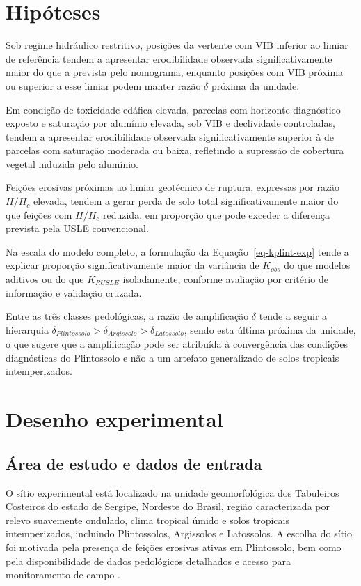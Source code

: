 \documentclass[
  brazilian,
  authoryear,
  preprint]{elsarticle}
\begin{document}
\section{Hipóteses}\label{hipuxf3teses}

Sob regime hidráulico restritivo, posições da vertente com VIB inferior
ao limiar de referência tendem a apresentar erodibilidade observada
significativamente maior do que a prevista pelo nomograma, enquanto
posições com VIB próxima ou superior a esse limiar podem manter razão
\(\delta\) próxima da unidade.

Em condição de toxicidade edáfica elevada, parcelas com horizonte
diagnóstico exposto e saturação por alumínio elevada, sob VIB e
declividade controladas, tendem a apresentar erodibilidade observada
significativamente superior à de parcelas com saturação moderada ou
baixa, refletindo a supressão de cobertura vegetal induzida pelo
alumínio.

Feições erosivas próximas ao limiar geotécnico de ruptura, expressas por
razão \(H/H_c\) elevada, tendem a gerar perda de solo total
significativamente maior do que feições com \(H/H_c\) reduzida, em
proporção que pode exceder a diferença prevista pela USLE convencional.

Na escala do modelo completo, a formulação da
Equação~\ref{eq-kplint-exp} tende a explicar proporção
significativamente maior da variância de \(K_{obs}\) do que modelos
aditivos ou do que \(K_{RUSLE}\) isoladamente, conforme avaliação por
critério de informação e validação cruzada.

Entre as três classes pedológicas, a razão de amplificação \(\delta\)
tende a seguir a hierarquia
\(\delta_{Plintossolo} > \delta_{Argissolo} > \delta_{Latossolo}\),
sendo esta última próxima da unidade, o que sugere que a amplificação
pode ser atribuída à convergência das condições diagnósticas do
Plintossolo e não a um artefato generalizado de solos tropicais
intemperizados.

\section{Desenho experimental}\label{desenho-experimental}

\subsection{Área de estudo e dados de
entrada}\label{uxe1rea-de-estudo-e-dados-de-entrada}

O sítio experimental está localizado na unidade geomorfológica dos
Tabuleiros Costeiros do estado de Sergipe, Nordeste do Brasil, região
caracterizada por relevo suavemente ondulado, clima tropical úmido e
solos tropicais intemperizados, incluindo Plintossolos, Argissolos e
Latossolos. A escolha do sítio foi motivada pela presença de feições
erosivas ativas em Plintossolo, bem como pela disponibilidade de dados
pedológicos detalhados e acesso para monitoramento de campo
\citep{nascimento_pedrotti_2004}.
\end{document}
